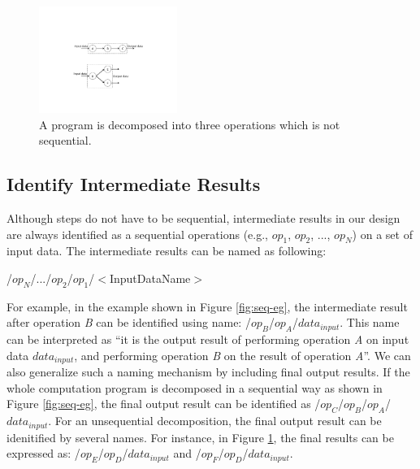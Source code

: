 \begin{figure}
\begin{center}
\includegraphics[width=0.4\textwidth]{fig-p-r/non-seq-eg.pdf}
\end{center}
\caption{A program is decomposed into three operations which is not sequential.}
\label{fig:non-seq-eg}
\end{figure}

\subsection{Identify Intermediate Results}
Although steps do not have to be sequential, intermediate results in our design
are always identified as a sequential operations (e.g., $op_1$, $op_2$, ..., $op_N$) on a
set of input data.  The intermediate results can be named as following:
\begin{center}
/$op_N$/.../$op_2$/$op_1$/$<$InputDataName$>$
\end{center}
For example, in the example shown in Figure \ref{fig:seq-eg}, the intermediate
result after operation {\it B} can be identified using name: /$op_B$/$op_A$/$
data_{input}$.  This name can be interpreted as ``it is the output result of
performing operation {\it A} on input data $data_{input}$, and performing
operation {\it B} on the result of operation {\it A}''.  We can also generalize
such a naming mechanism by including final output results.  If the whole
computation program is decomposed in a sequential way as shown in Figure
\ref{fig:seq-eg}, the final output result can be identified as
/$op_C$/$op_B$/$op_A$/$data_{input}$.  For an unsequential decomposition, the
final output result can be idenitified by several names.  For instance, in
Figure \ref{fig:non-seq-eg}, the final results can be expressed as:
/$op_E$/$op_D$/$data_{input}$ and /$op_F$/$op_D$/$data_{input}$.

